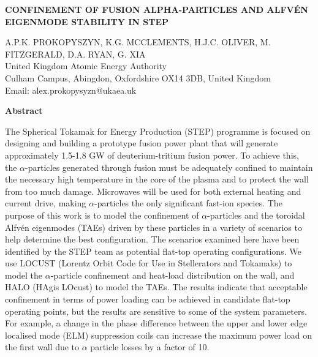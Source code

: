 \documentclass[10pt, a4paper, twoside]{article}
\begin{document}
\begin{flushleft}
\fontsize{12}{14}\selectfont \textbf{CONFINEMENT OF FUSION ALPHA-PARTICLES AND ALFV\'EN EIGENMODE STABILITY IN STEP}

\fontsize{10}{13}\selectfont
A.P.K. PROKOPYSZYN, K.G. MCCLEMENTS, H.J.C. OLIVER, M. FITZGERALD, D.A. RYAN, G. XIA \\
United Kingdom Atomic Energy Authority \\
Culham Campus, Abingdon, Oxfordshire OX14 3DB, United Kingdom \\
Email: alex.prokopysyzn@ukaea.uk

\end{flushleft}

\begin{flushleft}
\textbf{Abstract}
\end{flushleft}

\setlength{\parindent}{1cm}
\fontsize{9}{12}\selectfont

The Spherical Tokamak for Energy Production (STEP) programme is focused on designing and building a prototype fusion power plant that will generate approximately 1.5-1.8 GW of deuterium-tritium fusion power. To achieve this, the $\alpha$-particles generated through fusion must be adequately confined to maintain the necessary high temperature in the core of the plasma and to protect the wall from too much damage. Microwaves will be used for both external heating and current drive, making $\alpha$-particles the only significant fast-ion species. The purpose of this work is to model the confinement of $\alpha$-particles and the toroidal Alfvén eigenmodes (TAEs) driven by these particles in a variety of scenarios to help determine the best configuration. The scenarios examined here have been identified by the STEP team as potential flat-top operating configurations. We use LOCUST (Lorentz Orbit Code for Use in Stellerators and Tokamaks) to model the $\alpha$-particle confinement and heat-load distribution on the wall, and HALO (HAgis LOcust) to model the TAEs. The results indicate that acceptable confinement in terms of power loading can be achieved in candidate flat-top operating points, but the results are sensitive to some of the system parameters. For example, a change in the phase difference between the upper and lower edge localised mode (ELM) suppression coils can increase the maximum power load on the first wall due to $\alpha$ particle losses by a factor of 10.
\end{document}
